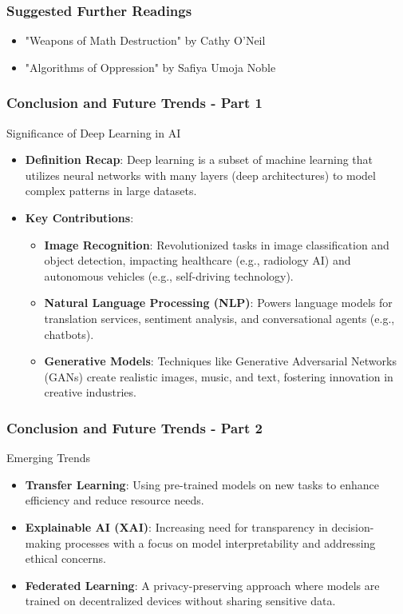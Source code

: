 \documentclass[aspectratio=169]{beamer}
\begin{document}
\begin{frame}[fragile]
    \frametitle{Suggested Further Readings}
    \begin{itemize}
        \item "Weapons of Math Destruction" by Cathy O'Neil
        \item "Algorithms of Oppression" by Safiya Umoja Noble
    \end{itemize}
\end{frame}

\begin{frame}[fragile]
    \frametitle{Conclusion and Future Trends - Part 1}
    \begin{block}{Significance of Deep Learning in AI}
        \begin{itemize}
            \item \textbf{Definition Recap}: Deep learning is a subset of machine learning that utilizes neural networks with many layers (deep architectures) to model complex patterns in large datasets.
            \item \textbf{Key Contributions}:
            \begin{itemize}
                \item \textbf{Image Recognition}: Revolutionized tasks in image classification and object detection, impacting healthcare (e.g., radiology AI) and autonomous vehicles (e.g., self-driving technology).
                \item \textbf{Natural Language Processing (NLP)}: Powers language models for translation services, sentiment analysis, and conversational agents (e.g., chatbots).
                \item \textbf{Generative Models}: Techniques like Generative Adversarial Networks (GANs) create realistic images, music, and text, fostering innovation in creative industries.
            \end{itemize}
        \end{itemize}
    \end{block}
\end{frame}

\begin{frame}[fragile]
    \frametitle{Conclusion and Future Trends - Part 2}
    \begin{block}{Emerging Trends}
        \begin{itemize}
            \item \textbf{Transfer Learning}: Using pre-trained models on new tasks to enhance efficiency and reduce resource needs.
            \item \textbf{Explainable AI (XAI)}: Increasing need for transparency in decision-making processes with a focus on model interpretability and addressing ethical concerns.
            \item \textbf{Federated Learning}: A privacy-preserving approach where models are trained on decentralized devices without sharing sensitive data.
        \end{itemize}
    \end{block}
\end{frame}
\end{document}

